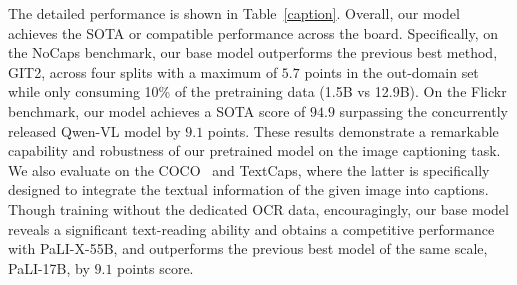 The detailed performance is shown in Table~\ref{caption}.  Overall, our model achieves the SOTA or compatible performance across the board. Specifically, on the NoCaps benchmark, our base model outperforms the previous best method, GIT2, across four splits with a maximum of $5.7$ points in the out-domain set while only consuming 10\% of the pretraining data (1.5B vs 12.9B). On the Flickr benchmark, our model achieves a SOTA score of $94.9$ surpassing the concurrently released Qwen-VL model by $9.1$ points. These results demonstrate a remarkable capability and robustness of our pretrained model on the image captioning task.
We also evaluate on the COCO~\citep{lin2014microsoft} and TextCaps, where the latter is specifically designed to integrate the textual information of the given image into captions.
Though training without the dedicated OCR data, encouragingly, our base model reveals a significant text-reading ability and obtains a competitive performance with PaLI-X-55B, and outperforms the previous best model of the same scale, PaLI-17B, by $9.1$ points score.

